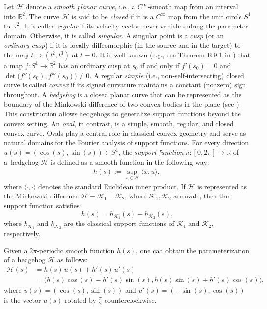\documentclass{amsart}
\theoremstyle{definition}
\numberwithin{equation}{section}
\begin{document}
Let $\mathcal{H}$ denote a \textit{smooth planar curve}, i.e., a $C^\infty$-smooth map from an interval into $\mathbb{R}^2$. The curve $\mathcal{H}$ is said to be \textit{closed} if it is a $C^\infty$ map from the unit circle $S^1$ to $\mathbb{R}^2$. It is called \textit{regular} if its velocity vector never vanishes along the parameter domain. Otherwise, it is called \textit{ singular}. A singular point is a \textit{cusp} (or an \textit{ordinary cusp}) if it is locally diffeomorphic (in the source and in the target) to the map $t\mapsto(t^2,t^3)$ at $t=0$. It is well known (e.g., see Theorem B.9.1 in \cite{UYBook}) that a map $f: S^1 \to \mathbb{R}^2$ has an ordinary cusp at $s_0$ if and only if $f'(s_0)=0$ and $\det\big(f''(s_0),f'''(s_0)\big)\neq 0.$ A regular \textit{simple} (i.e., non-self-intersecting) closed curve is called \textit{convex} if its signed curvature maintains a constant (nonzero) sign throughout. A \textit{hedgehog} is a closed planar curve that can be represented as the boundary of the Minkowski difference of two convex bodies in the plane (see \cite{MMY, MMY2}). This construction allows hedgehogs to generalize support functions beyond the convex setting. An \textit{oval}, in contrast, is a simple, smooth, regular, and closed convex curve. Ovals play a central role in classical convex geometry and serve as natural domains for the Fourier analysis of support functions.
For every direction $u(s) = (\cos (s), \sin (s)) \in S^1$, the \textit{support function} $h: [0,2\pi] \to \mathbb{R}$ of a~hedgehog $\mathcal{H}$ is defined as a smooth function in the following way:
\begin{align*}
h(s):= \sup_{x \in \mathcal{H}} \langle x, u \rangle,\
\end{align*}
where $\langle \cdot, \cdot \rangle$ denotes the standard Euclidean inner product.
If $\mathcal{H}$ is represented as the Minkowski difference $\mathcal{H} = \mathcal{K}_1 - \mathcal{K}_2$, where $\mathcal{K}_1, \mathcal{K}_2$ are ovals, then the support function satisfies:
$$
h(s) = h_{\mathcal{K}_1}(s) - h_{\mathcal{K}_2}(s),
$$
where $h_{\mathcal{K}_1}$ and $h_{\mathcal{K}_2}$ are the classical support functions of $\mathcal{K}_1$ and $\mathcal{K}_2$, respectively.

Given a $2\pi$-periodic smooth function $h(s)$, one can obtain the parameterization of a hedgehog $\mathcal{H}$ as follows:
\begin{align}
\label{eqHedghehogForm}\mathcal{H}(s) &= h(s)\, u(s) + h'(s)\, u'(s)\\ 
\nonumber&=\Big( h(s) \cos(s) - h'(s) \sin(s),  h(s) \sin(s) + h'(s) \cos(s) \Big),
\end{align}
where $u(s) = (\cos (s), \sin (s))$ and $u'(s) = (-\sin (s), \cos (s))$ is the vector $u(s)$ rotated by $\frac{\pi}{2}$ counterclockwise.
\end{document}
